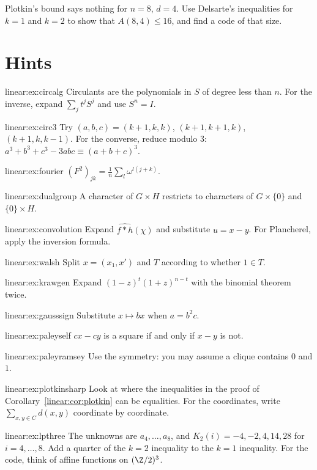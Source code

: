 \begin{exercise}[$\star\star\star$]\label{linear:ex:lpthree}
Plotkin's bound says nothing for $n=8$, $d=4$. Use Delsarte's inequalities for $k=1$ and $k=2$ to show that $A(8,4)\le16$, and find
a code of that size.
\end{exercise}

\section{Hints}

\begin{hint}{linear:ex:circalg}
Circulants are the polynomials in $S$ of degree less than $n$. For the inverse, expand $\sum_jt^jS^j$ and use $S^n=I$.
\end{hint}
\begin{hint}{linear:ex:circ3}
Try $(a,b,c)=(k+1,k,k)$, $(k+1,k+1,k)$, $(k+1,k,k-1)$. For the converse, reduce modulo $3$: $a^3+b^3+c^3-3abc\equiv(a+b+c)^3$.
\end{hint}
\begin{hint}{linear:ex:fourier}
$(F^2)_{jk}=\frac1n\sum_l\omega^{l(j+k)}$.
\end{hint}
\begin{hint}{linear:ex:dualgroup}
A character of $G\times H$ restricts to characters of $G\times\{0\}$ and $\{0\}\times H$.
\end{hint}
\begin{hint}{linear:ex:convolution}
Expand $\widehat{f*h}(\chi)$ and substitute $u=x-y$. For Plancherel, apply the inversion formula.
\end{hint}
\begin{hint}{linear:ex:walsh}
Split $x=(x_1,x')$ and $T$ according to whether $1\in T$.
\end{hint}
\begin{hint}{linear:ex:krawgen}
Expand $(1-z)^t(1+z)^{n-t}$ with the binomial theorem twice.
\end{hint}
\begin{hint}{linear:ex:gausssign}
Substitute $x\mapsto bx$ when $a=b^2c$.
\end{hint}
\begin{hint}{linear:ex:paleyself}
$cx-cy$ is a square if and only if $x-y$ is not.
\end{hint}
\begin{hint}{linear:ex:paleyramsey}
Use the symmetry: you may assume a clique contains $0$ and $1$.
\end{hint}
\begin{hint}{linear:ex:plotkinsharp}
Look at where the inequalities in the proof of Corollary~\ref{linear:cor:plotkin} can be equalities. For the coordinates, write
$\sum_{x,y\in C}d(x,y)$ coordinate by coordinate.
\end{hint}
\begin{hint}{linear:ex:lpthree}
The unknowns are $a_4,\dots,a_8$, and $K_2(i)=-4,-2,4,14,28$ for $i=4,\dots,8$. Add a quarter of the $k=2$ inequality to the
$k=1$ inequality. For the code, think of affine functions on $(\Z/2)^3$.
\end{hint}

